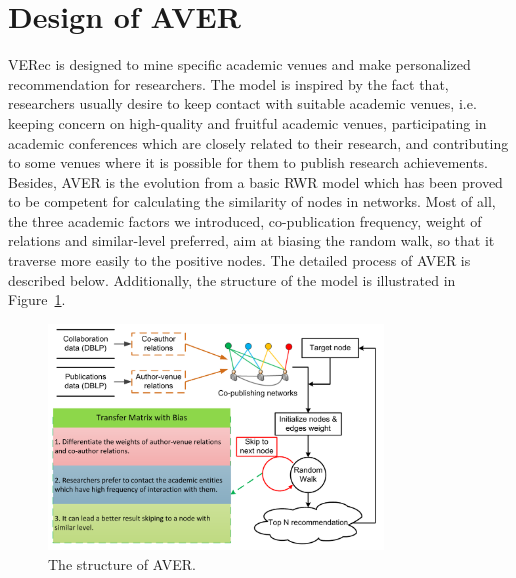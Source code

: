 \documentclass[9pt]{acm_proc_article-sp}
\begin{document}
\section{Design of AVER}
VERec is designed to mine specific academic venues and make personalized recommendation for researchers. The model is inspired by the fact that, researchers usually desire to keep contact with suitable academic venues, i.e. keeping concern on high-quality and fruitful academic venues, participating in academic conferences which are closely related to their research, and contributing to some venues where it is possible for them to publish research achievements. Besides, AVER is the evolution from a basic RWR model which has been proved to be competent for calculating the similarity of nodes in networks. Most of all, the three academic factors we introduced, co-publication frequency, weight of relations and similar-level preferred, aim at biasing the random walk, so that it traverse more easily to the positive nodes. The detailed process of AVER is described below. Additionally, the structure of the model is illustrated in Figure~\ref{Fig1}.
\begin{figure}[!ht]
\centering
\includegraphics [width=3.5in]{Fig1.pdf}
\caption{The structure of AVER.}
\label{Fig1}
\end{figure}
\end{document}
